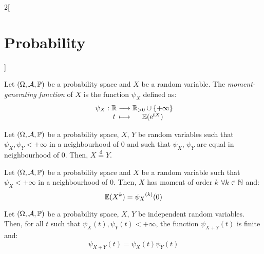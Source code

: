 \documentclass[../../../main.tex]{subfiles}
\begin{document}
\begin{multicols}{2}[\section{Probability}]
\begin{corollary}
    \end{corollary}
    \begin{definition}
        Let $(\Omega,\mathcal{A},\mathbb{P})$ be a probability space and $X$ be a random variable. The \textit{moment-generating function} of $X$ is the function $\psi_X$ defined as:
        $$\function{\psi_X}{\RR}{\RR_{>0}\cup\{+\infty\}}{t}{\Exp(\exp{tX})}$$
    \end{definition}
    \begin{theorem}
        Let $(\Omega,\mathcal{A},\mathbb{P})$ be a probability space, $X$, $Y$ be random variables such that $\psi_X,\psi_Y<+\infty$ in a neighbourhood of 0 and such that $\psi_X$, $\psi_Y$ are equal in neighbourhood of 0. Then, $X\overset{\text{d}}{=}Y$.
    \end{theorem}
    \begin{theorem}
        Let $(\Omega,\mathcal{A},\mathbb{P})$ be a probability space and $X$ be a random variable such that $\psi_X<+\infty$ in a neighbourhood of 0. Then, $X$ has moment of order $k$ $\forall k\in\mathbb{N}$ and: $$\mathbb{E}(X^k)={\psi_X}^{(k)}(0)$$
    \end{theorem}
    \begin{theorem}
        Let $(\Omega,\mathcal{A},\mathbb{P})$ be a probability space, $X$, $Y$ be independent random variables. Then, for all $t$ such that $\psi_X(t),\psi_Y(t)<+\infty$, the function $\psi_{X+Y}(t)$ is finite and: $$\psi_{X+Y}(t)=\psi_X(t)\psi_Y(t)$$
    \end{theorem}

\end{multicols}
\end{document}

